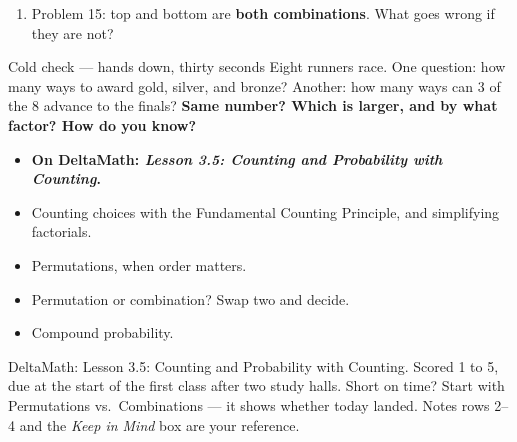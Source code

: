 \documentclass[aspectratio=169, 11pt]{beamer}
\begin{document}
\begin{frame}[t, plain]
  \vspace{4pt}
  \begin{enumerate}\setlength{\itemsep}{5pt}
    \item Problem 15: top and bottom are \textbf{both combinations}. What goes wrong if they are not?
  \end{enumerate}
  \vspace{6pt}
  \begin{block}{Cold check --- hands down, thirty seconds}
    Eight runners race. One question: how many ways to award gold, silver, and bronze? Another:
    how many ways can 3 of the 8 advance to the finals? \textbf{Same number? Which is larger,
    and by what factor? How do you know?}
  \end{block}
\end{frame}

\begin{frame}[t, plain]
  \begin{itemize}\setlength{\itemsep}{5pt}
    \item \textbf{On DeltaMath: \emph{Lesson 3.5: Counting and Probability with Counting}.}
    \item Counting choices with the Fundamental Counting Principle, and simplifying factorials.
    \item Permutations, when order matters.
    \item Permutation or combination? Swap two and decide.
    \item Compound probability.
  \end{itemize}
  \begin{block}{DeltaMath: Lesson 3.5: Counting and Probability with Counting. Scored 1 to 5, due at the start of the first class after two study halls.}
    Short on time? Start with Permutations vs.\ Combinations --- it shows whether today landed.
    Notes rows 2--4 and the \emph{Keep in Mind} box are your reference.
  \end{block}
\end{frame}
\end{document}
